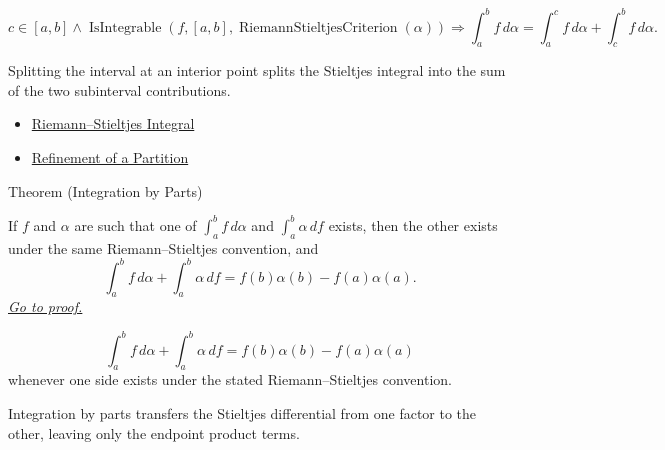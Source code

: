 \begin{remark*}
\[
c\in[a,b]\land
\operatorname{IsIntegrable}(f,[a,b],\operatorname{RiemannStieltjesCriterion}(\alpha))
\Longrightarrow
\int_a^b f\,d\alpha
=
\int_a^c f\,d\alpha+\int_c^b f\,d\alpha.
\]
\end{remark*}

\begin{remark*}[Interpretation]
Splitting the interval at an interior point splits the Stieltjes integral into
the sum of the two subinterval contributions.
\end{remark*}

\begin{dependencies}
\begin{itemize}
  \item \hyperref[def:riemann-stieltjes-integral]{Riemann--Stieltjes Integral}
  \item \hyperref[def:partition-refinement]{Refinement of a Partition}
\end{itemize}
\end{dependencies}

\begin{theorembox}{Theorem (Integration by Parts)}
\begin{theorem}
\label{thm:rs-integration-by-parts}
If \(f\) and \(\alpha\) are such that one of
\(\int_a^b f\,d\alpha\) and \(\int_a^b \alpha\,df\) exists, then the other
exists under the same Riemann--Stieltjes convention, and
\[
  \int_a^b f\,d\alpha+\int_a^b \alpha\,df
  =
  f(b)\alpha(b)-f(a)\alpha(a).
\]
\hyperref[prf:rs-integration-by-parts]{\textit{Go to proof.}}
\end{theorem}
\end{theorembox}

\begin{remark*}
\[
\int_a^b f\,d\alpha+\int_a^b \alpha\,df
=
f(b)\alpha(b)-f(a)\alpha(a)
\]
whenever one side exists under the stated Riemann--Stieltjes convention.
\end{remark*}

\begin{remark*}[Interpretation]
Integration by parts transfers the Stieltjes differential from one factor to
the other, leaving only the endpoint product terms.
\end{remark*}

